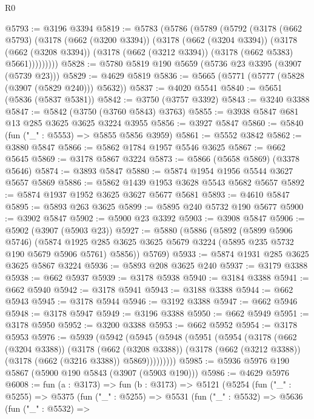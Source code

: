 \begin{lexlean}{R0}
\begin{coremodule}
@5793 := @3196 @3394
@5819 := @5783
    (@5786
      (@5789
        (@5792
          (@3178
            (@662 @5793)
            (@3178
              (@662 (@3200 @3394))
              (@3178
                (@662 (@3204 @3394))
                (@3178
                  (@662 (@3208 @3394))
                  (@3178 (@662 (@3212 @3394)) (@3178 (@662 @5383) @5661)))))))))
@5828 := @5780 @5819 @190 @5659 (@5736 @23 @3395 (@3907 (@5739 @23)))
@5829 := @4629 @5819
@5836 := @5665 (@5771 (@5777 (@5828 (@3907 (@5829 @240))) @5632))
@5837 := @4020 @5541
@5840 := @5651 (@5836 (@5837 @5381))
@5842 := @3750 (@3757 @3392)
@5843 := @3240 @3388
@5847 := @5842 (@3750 (@3760 @5843) @3763)
@5855 := @3938 @5847 @681 @13 @285 @3625 @3625 @3224 @3955
@5856 := @3927 @5847
@5860 := @5840 (fun ("_" : @5553) => @5855 @5856 @3959)
@5861 := @5552 @3842
@5862 := @3880 @5847
@5866 := @5862 @1784 @1957 @5546 @3625
@5867 := @662 @5645
@5869 := @3178 @5867 @3224
@5873 := @5866 (@5658 @5869) (@3378 @5646)
@5874 := @3893 @5847
@5880 := @5874 @1954 @1956 @5544 @3627 @5657 @5869
@5886 := @5862 @1439 @1953 @3628 @5543 @5682 @5657
@5892 := @5874 @1937 @1952 @3625 @3627 @5677 @5681
@5893 := @4610 @5847
@5895 := @5893 @263 @3625
@5899 := @5895 @240 @5732 @190 @5677
@5900 := @3902 @5847
@5902 := @5900 @23 @3392
@5903 := @3908 @5847
@5906 := @5902 (@3907 (@5903 @23))
@5927 := @5880
    (@5886
      (@5892
        (@5899 @5906 @5746)
        (@5874 @1925 @285 @3625 @3625 @5679 @3224 (@5895 @235 @5732 @190 @5679 @5906 @5761) @5856))
      @5769)
@5933 := @5874 @1931 @285 @3625 @3625 @5867 @3224
@5936 := @5893 @208 @3625 @240
@5937 := @3179 @3388
@5938 := @662 @5937
@5939 := @3178 @5938
@5940 := @3184 @3388
@5941 := @662 @5940
@5942 := @3178 @5941
@5943 := @3188 @3388
@5944 := @662 @5943
@5945 := @3178 @5944
@5946 := @3192 @3388
@5947 := @662 @5946
@5948 := @3178 @5947
@5949 := @3196 @3388
@5950 := @662 @5949
@5951 := @3178 @5950
@5952 := @3200 @3388
@5953 := @662 @5952
@5954 := @3178 @5953
@5976 := @5939
    (@5942
      (@5945
        (@5948
          (@5951
            (@5954
              (@3178
                (@662 (@3204 @3388))
                (@3178
                  (@662 (@3208 @3388))
                  (@3178 (@662 (@3212 @3388)) (@3178 (@662 (@3216 @3388)) @5869)))))))))
@5985 := @5936 @5976 @190 @5867 (@5900 @190 @5843 (@3907 (@5903 @190)))
@5986 := @4629 @5976
@6008 := fun (a : @3173) =>
  fun (b : @3173) =>
  @5121
    (@5254
      (fun ("_" : @5255) =>
      @5375
        (fun ("_" : @5255) =>
        @5531
          (fun ("_" : @5532) =>
          @5636
            (fun ("_" : @5532) =>

\end{coremodule}
\end{lexlean}
